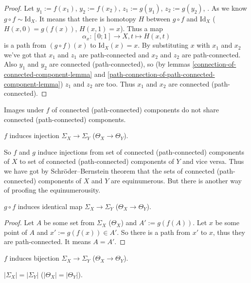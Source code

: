 \documentclass[12pt,a4paper]{article}
\newcommand{\Id}{\mathrm{Id}}
\begin{document}
\begin{enumproblem}
        \begin{proof}
            Let $y_1 := f(x_1)$, $y_2 := f(x_2)$, $z_1 := g(y_1)$, $z_2 := g(y_2)$, . As we know $g \circ f \sim \Id_X$. It means that there is homotopy $H$ between $g \circ f$ and $\Id_X$ ($H(x, 0) = g(f(x))$, $H(x, 1) = x$). Thus a map
            \[\alpha_x: [0; 1] \to X, t \mapsto H(x, t)\]
            is a path from $(g \circ f)(x)$ to $\Id_X(x) = x$. By substituting $x$ with $x_1$ and $x_2$ we've got that $x_1$ and $z_1$ are path-connected and $x_2$ and $z_2$ are path-connected. Also $y_1$ and $y_2$ are connected (path-connected), so (by lemmas \ref{connection-of-connected-component-lemma} and \ref{path-connection-of-path-connected-component-lemma}) $z_1$ and $z_2$ are too. Thus $x_1$ and $x_2$ are connected (path-connected).
        \end{proof}

        \begin{corollary}
            Images under $f$ of connected (path-connected) components do not share connected (path-connected) components.
        \end{corollary}

        \begin{corollary}
            $f$ induces injection $\Sigma_X \to \Sigma_Y$ ($\Theta_X \to \Theta_Y$).
        \end{corollary}

        So $f$ and $g$ induce injections from set of connected (path-connected) components of $X$ to set of connected (path-connected) components of $Y$ and vice versa. Thus we have got by Schröder–Bernstein theorem that the sets of connected (path-connected) components of $X$ and $Y$ are equinumerous. But there is another way of proofing the equinumerousity.

        \begin{lemma}
            $g \circ f$ induces identical map $\Sigma_X \to \Sigma_Y$ ($\Theta_X \to \Theta_Y$).
        \end{lemma}

        \begin{proof}
            Let $A$ be some set from $\Sigma_X$ ($\Theta_X$) and $A' := g(f(A))$. Let $x$ be some point of $A$ and $x' := g(f(x)) \in A'$. So there is a path from $x'$ to $x$, thus they are path-connected. It means $A = A'$.
        \end{proof}

        \begin{corollary}
            $f$ induces bijection $\Sigma_X \to \Sigma_Y$ ($\Theta_X \to \Theta_Y$).
        \end{corollary}

        \begin{corollary}
            $|\Sigma_X| = |\Sigma_Y|$ ($|\Theta_X| = |\Theta_Y|$).
        \end{corollary}
    \end{enumproblem}
\end{document}
